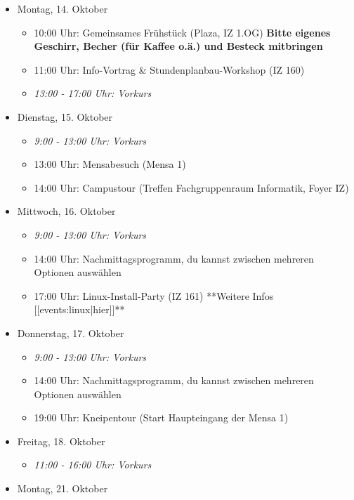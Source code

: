 \begin{itemize}
    \item Montag, 14. Oktober
        \begin{itemize}
            \item 10:00 Uhr: Gemeinsames Frühstück (Plaza, IZ 1.OG) \textbf{Bitte eigenes Geschirr, Becher (für Kaffee o.ä.) und Besteck mitbringen}
            \item 11:00 Uhr: Info-Vortrag \& Stundenplanbau-Workshop (IZ 160)
            \item \textit{13:00 - 17:00 Uhr: Vorkurs}
        \end{itemize}
    \item Dienstag, 15. Oktober
        \begin{itemize}
            \item \textit{9:00 - 13:00 Uhr: Vorkurs}
            \item 13:00 Uhr: Mensabesuch (Mensa 1)
            \item 14:00 Uhr: Campustour (Treffen Fachgruppenraum Informatik, Foyer IZ)
        \end{itemize}
    \item Mittwoch, 16. Oktober
        \begin{itemize}
            \item \textit{9:00 - 13:00 Uhr: Vorkurs}
            \item 14:00 Uhr: Nachmittagsprogramm, du kannst zwischen mehreren Optionen auswählen
            \item 17:00 Uhr: Linux-Install-Party (IZ 161) **Weitere Infos [[events:linux|hier]]**
        \end{itemize}
    \pagebreak
    \item Donnerstag,  17. Oktober
        \begin{itemize}
            \item \textit{9:00 - 13:00 Uhr: Vorkurs}
            \item 14:00 Uhr: Nachmittagsprogramm, du kannst zwischen mehreren Optionen auswählen
            \item 19:00 Uhr: Kneipentour (Start Haupteingang der Mensa 1)
        \end{itemize}
    \item Freitag, 18. Oktober
        \begin{itemize}
            \item \textit{11:00 - 16:00 Uhr: Vorkurs}
        \end{itemize}
    \item Montag, 21. Oktober

\end{itemize}
